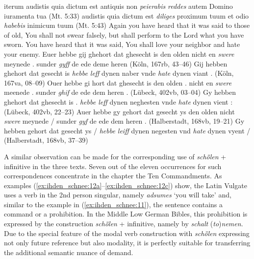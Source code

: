 \documentclass[output=paper,colorlinks,citecolor=brown]{langscibook}
\begin{document}
\largerpage[-1]

\ea iterum audistis quia dictum est antiquis non \textit{peierabis} \textit{reddes} autem Domino iuramenta tua (Mt. 5:33) \label{ex:ihden_schnee:11} 
\exi{} audistis quia dictum est \textit{diliges} proximum tuum et odio \textit{habebis} inimicum tuum (Mt. 5:43)
\exi{} Again you have heard that it was said to those of old, You shall not swear falsely, but shall perform to the Lord what you have sworn.
\exi{} You have heard that it was said, You shall love your neighbor and hate your enemy.
\ea Euer hebbe gij ghehort dat ghesecht is den olden nicht en \textit{swere} meynede . sunder \textit{gyff} de ede deme heren (Köln, 167rb, 43--46)\label{ex:ihden_schnee:11a} 
\ex Gij hebben ghehort dat gesecht is \textit{hebbe leff} dynen naber vnde \textit{hate} dynen viant . (Köln, 167va, 08--09)\label{ex:ihden_schnee:11a1} 
\ex Ouer hebbe gi hort dat ghesecht is den olden . nicht en \textit{swere} meenede . sunder \textit{ghif} de ede dem heren . (Lübeck, 402vb, 03--04)\label{ex:ihden_schnee:11b} 
\ex Gy hebben ghehort dat ghesecht is . \textit{hebbe leff} dynen neghesten vnde \textit{hate} dynen vient : (Lübeck, 402vb, 22--23)\label{ex:ihden_schnee:11b1}
\ex Auer hebbe gy gehort dat gesecht ys den olden nicht \textit{swere} meynede / sunder \textit{gyf} de ede dem heren . (Halberstadt, 168vb, 19--21)\label{ex:ihden_schnee:11c}
\ex Gy hebben gehort dat gesecht ys / \textit{hebbe leiff} dynen negesten vnd \textit{hate} dynen vyent / (Halberstadt, 168vb, 37--39)\label{ex:ihden_schnee:11c1}
\z
\z
{} %

A similar observation can be made for the corresponding use of \textit{schȫlen} + infinitive in the three texts. Seven out of the eleven occurrences for such correspondences concentrate in the chapter the Ten Commandments. As examples (\ref{ex:ihden_schnee:12a}--\ref{ex:ihden_schnee:12c}) show, the Latin Vulgate uses a verb in the 2nd person singular, namely \textit{adsumes} `you will take' and, similar to the example in (\ref{ex:ihden_schnee:11}), the sentence contains a command or a prohibition. In the Middle Low German Bibles, this prohibition is expressed by the construction \textit{schȫlen} + infinitive, namely by \textit{schalt} (\textit{to})\textit{nemen}. Due to the special feature of the modal verb construction with \textit{schȫlen} expressing not only future reference but also modality, it is perfectly suitable for transferring the additional semantic nuance of demand.
\end{document}
